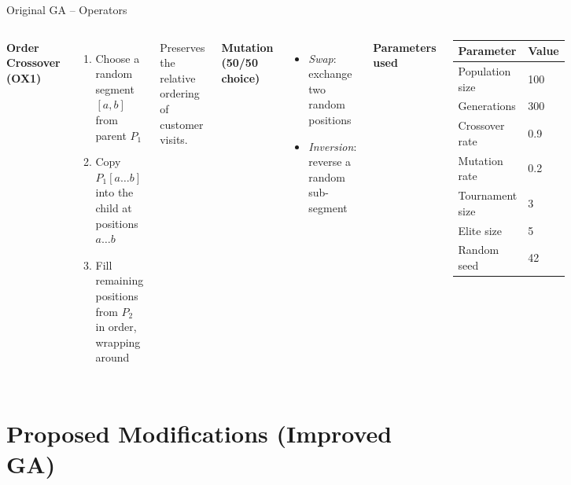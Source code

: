 \documentclass[aspectratio=169]{beamer}
\begin{document}
\begin{frame}{Original GA -- Operators}
  \begin{columns}
    \textbf{Order Crossover (OX1)} \cite{davis1985applying}
    \begin{enumerate}
      \item Choose a random segment $[a, b]$ from parent $P_1$
      \item Copy $P_1[a\ldots b]$ into the child at positions $a\ldots b$
      \item Fill remaining positions from $P_2$ in order, wrapping around
    \end{enumerate}
    Preserves the relative ordering of customer visits.

    \vspace{8pt}
    \textbf{Mutation (50/50 choice)}
    \begin{itemize}
      \item \emph{Swap}: exchange two random positions
      \item \emph{Inversion}: reverse a random sub-segment
    \end{itemize}

    \textbf{Parameters used}
    \begin{center}
    \begin{tabular}{ll}
      \toprule
      Parameter & Value \\
      \midrule
      Population size     & 100  \\
      Generations         & 300  \\
      Crossover rate      & 0.9  \\
      Mutation rate       & 0.2  \\
      Tournament size     & 3    \\
      Elite size          & 5    \\
      Random seed         & 42   \\
      \bottomrule
    \end{tabular}
    \end{center}
  \end{columns}
\end{frame}

\section{Proposed Modifications (Improved GA)}
\end{document}
